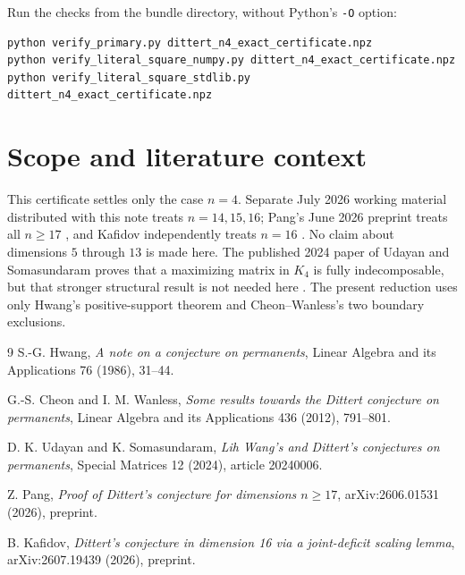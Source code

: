 \documentclass[11pt]{article}
\begin{document}
Run the checks from the bundle directory, without Python's \texttt{-O} option:
\begin{verbatim}
python verify_primary.py dittert_n4_exact_certificate.npz
python verify_literal_square_numpy.py dittert_n4_exact_certificate.npz
python verify_literal_square_stdlib.py dittert_n4_exact_certificate.npz
\end{verbatim}

\section{Scope and literature context}
This certificate settles only the case $n=4$. Separate July 2026 working material distributed with this note treats $n=14,15,16$; Pang's June 2026 preprint treats all $n\ge17$ \cite{Pang2026}, and Kafidov independently treats $n=16$ \cite{Kafidov2026}. No claim about dimensions $5$ through $13$ is made here. The published 2024 paper of Udayan and Somasundaram proves that a maximizing matrix in $K_4$ is fully indecomposable, but that stronger structural result is not needed here \cite{UdayanSomasundaram2024}. The present reduction uses only Hwang's positive-support theorem and Cheon--Wanless's two boundary exclusions.

\begin{thebibliography}{9}
S.-G. Hwang,
\emph{A note on a conjecture on permanents},
Linear Algebra and its Applications 76 (1986), 31--44.

G.-S. Cheon and I. M. Wanless,
\emph{Some results towards the Dittert conjecture on permanents},
Linear Algebra and its Applications 436 (2012), 791--801.

D. K. Udayan and K. Somasundaram,
\emph{Lih Wang's and Dittert's conjectures on permanents},
Special Matrices 12 (2024), article 20240006.

Z. Pang,
\emph{Proof of Dittert's conjecture for dimensions $n\ge17$},
arXiv:2606.01531 (2026), preprint.

B. Kafidov,
\emph{Dittert's conjecture in dimension 16 via a joint-deficit scaling lemma},
arXiv:2607.19439 (2026), preprint.
\end{thebibliography}
\end{document}
